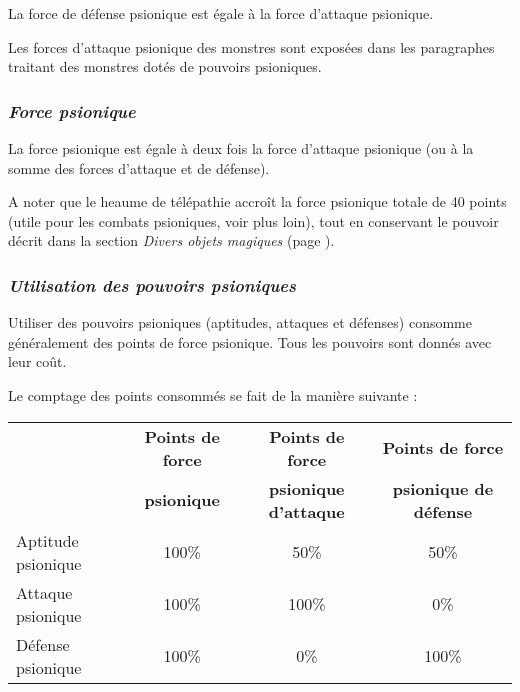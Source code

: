 \bigskip

La force de défense psionique est égale à la force d'attaque psionique.

\bigskip

Les forces d'attaque psionique des monstres sont exposées dans les paragraphes traitant des monstres dotés de pouvoirs psioniques.

\subsubsection*{\textit{Force psionique}}

La force psionique est égale à deux fois la force d'attaque psionique (ou à la somme des forces d'attaque et de défense).

\bigskip

A noter que le heaume de télépathie accroît la force psionique totale de 40 points (utile pour les combats psioniques, voir plus loin), tout en conservant le pouvoir décrit dans la section \textit{Divers objets magiques} (page \pageref{objet-heaume-telepathie}).


\subsubsection*{\textit{Utilisation des pouvoirs psioniques}}
\label{custom-utilisation-pouvoirs}

Utiliser des pouvoirs psioniques (aptitudes, attaques et défenses) consomme généralement des points de force psionique. Tous les pouvoirs sont donnés avec leur coût.

\bigskip

Le comptage des points consommés se fait de la manière suivante :

\bigskip

\begin{tabular}{lccc}
& \textbf{Points de force} & \textbf{Points de force} & \textbf{Points de force} \\
& \textbf{psionique} & \textbf{psionique d'attaque} & \textbf{psionique de défense} \\
Aptitude psionique & 100\%  & 50\%  & 50\%  \\
Attaque psionique & 100\%   & 100\% & 0\% \\
Défense psionique & 100\%   & 0\%   & 100\% \\
\end{tabular}

